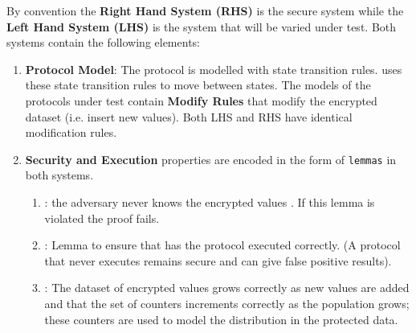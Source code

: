 \documentclass[journal]{IEEEtran}
\begin{document}
 By convention the \textbf{Right Hand System (RHS)} is the secure system while the \textbf{Left Hand System (LHS)} is the system that will be varied under test. Both systems contain the following elements:
\begin{enumerate}[label=(\Alph*)]
\item \textbf{Protocol Model}: The protocol is modelled with \tamarin{} state transition rules. \tamarin{} uses these state transition rules to move between states. The models of the protocols under test contain \textbf{Modify Rules} that modify the encrypted dataset (i.e. insert new values). Both LHS and RHS have identical modification rules.
\item \textbf{Security and Execution} properties are encoded in the form of \texttt{lemmas} in both systems. 
\begin{enumerate}
	\item {}: the adversary never knows the encrypted values \enc{}. If this lemma is violated the proof fails.
    \item {}: Lemma to ensure that has the protocol executed correctly. (A protocol that never executes remains secure and can give false positive results).
	\item {}: The dataset of encrypted values \enc{} grows correctly as new values are added and that the set of counters increments correctly as the population grows; these counters are used to model the distribution in the protected data.
\end{enumerate}


\end{enumerate}
\end{document}
